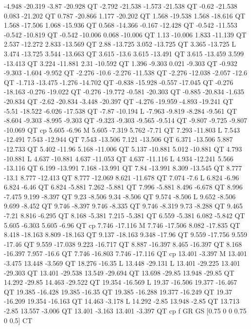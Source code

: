-4.948 -20.319 -3.87 -20.928 QT
-2.792 -21.538 -1.573 -21.538 QT
-0.62 -21.538 0.083 -21.202 QT
0.787 -20.866 1.177 -20.202 QT
1.568 -19.538 1.568 -18.616 QT
1.568 -17.506 1.068 -15.936 QT
0.568 -14.366 -0.167 -12.428 QT
-0.542 -11.553 -0.542 -10.819 QT
-0.542 -10.006 0.068 -10.006 QT
1.13 -10.006 1.833 -11.139 QT
2.537 -12.272 2.833 -13.569 QT
2.88 -13.725 3.052 -13.725 QT
3.365 -13.725 L
3.474 -13.725 3.544 -13.663 QT
3.615 -13.6 3.615 -13.491 QT
3.615 -13.459 3.599 -13.413 QT
3.224 -11.881 2.31 -10.592 QT
1.396 -9.303 0.021 -9.303 QT
-0.932 -9.303 -1.604 -9.952 QT
-2.276 -10.6 -2.276 -11.538 QT
-2.276 -12.038 -2.057 -12.6 QT
-1.713 -13.475 -1.276 -14.702 QT
-0.838 -15.928 -0.557 -17.045 QT
-0.276 -18.163 -0.276 -19.022 QT
-0.276 -19.772 -0.581 -20.303 QT
-0.885 -20.834 -1.635 -20.834 QT
-2.62 -20.834 -3.448 -20.397 QT
-4.276 -19.959 -4.893 -19.241 QT
-5.51 -18.522 -6.026 -17.538 QT
-7.87 -10.194 L
-7.963 -9.819 -8.284 -9.561 QT
-8.604 -9.303 -8.995 -9.303 QT
-9.323 -9.303 -9.565 -9.514 QT
-9.807 -9.725 -9.807 -10.069 QT
cp
5.605 -6.96 M
5.605 -7.319 5.762 -7.71 QT
7.293 -11.803 L
7.543 -12.491 7.543 -12.944 QT
7.543 -13.506 7.121 -13.506 QT
6.371 -13.506 5.887 -12.733 QT
5.402 -11.96 5.168 -11.006 QT
5.137 -10.881 5.012 -10.881 QT
4.793 -10.881 L
4.637 -10.881 4.637 -11.053 QT
4.637 -11.116 L
4.934 -12.241 5.566 -13.116 QT
6.199 -13.991 7.168 -13.991 QT
7.84 -13.991 8.309 -13.545 QT
8.777 -13.1 8.777 -12.413 QT
8.777 -12.069 8.621 -11.678 QT
7.074 -7.6 L
6.824 -6.96 6.824 -6.46 QT
6.824 -5.881 7.262 -5.881 QT
7.996 -5.881 8.496 -6.678 QT
8.996 -7.475 9.199 -8.397 QT
9.23 -8.506 9.34 -8.506 QT
9.574 -8.506 L
9.652 -8.506 9.699 -8.452 QT
9.746 -8.397 9.746 -8.335 QT
9.746 -8.319 9.73 -8.288 QT
9.465 -7.21 8.816 -6.295 QT
8.168 -5.381 7.215 -5.381 QT
6.559 -5.381 6.082 -5.842 QT
5.605 -6.303 5.605 -6.96 QT
cp
7.746 -17.116 M
7.746 -17.506 8.082 -17.835 QT
8.418 -18.163 8.809 -18.163 QT
9.137 -18.163 9.348 -17.96 QT
9.559 -17.756 9.559 -17.46 QT
9.559 -17.038 9.223 -16.717 QT
8.887 -16.397 8.465 -16.397 QT
8.168 -16.397 7.957 -16.6 QT
7.746 -16.803 7.746 -17.116 QT
cp
13.401 -3.397 M
13.401 -3.475 13.448 -3.569 QT
18.276 -16.35 L
13.448 -29.131 L
13.401 -29.225 13.401 -29.303 QT
13.401 -29.538 13.549 -29.694 QT
13.698 -29.85 13.948 -29.85 QT
14.292 -29.85 14.463 -29.522 QT
19.354 -16.569 L
19.37 -16.506 19.377 -16.467 QT
19.385 -16.428 19.385 -16.35 QT
19.385 -16.288 19.377 -16.249 QT
19.37 -16.209 19.354 -16.163 QT
14.463 -3.178 L
14.292 -2.85 13.948 -2.85 QT
13.713 -2.85 13.557 -3.006 QT
13.401 -3.163 13.401 -3.397 QT
cp
f
GR
GS
[0.75 0 0 0.75 0 0.5] CT
